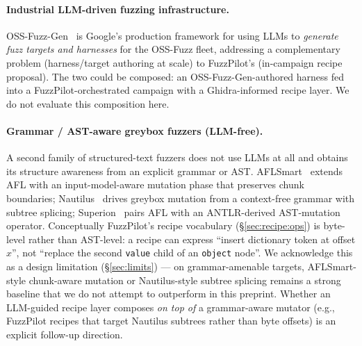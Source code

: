 \documentclass[11pt]{article}
\begin{document}
\paragraph{Industrial LLM-driven fuzzing infrastructure.}
OSS-Fuzz-Gen~\cite{liu2024ossfuzzgen} is Google's production
framework for using LLMs to \emph{generate fuzz targets and
harnesses} for the OSS-Fuzz fleet, addressing a complementary
problem (harness/target authoring at scale) to FuzzPilot's
(in-campaign recipe proposal). The two could be composed: an
OSS-Fuzz-Gen-authored harness fed into a FuzzPilot-orchestrated
campaign with a Ghidra-informed recipe layer. We do not evaluate
this composition here.

\paragraph{Grammar / AST-aware greybox fuzzers (LLM-free).}
A second family of structured-text fuzzers does not use LLMs at
all and obtains its structure awareness from an explicit
grammar or AST. AFLSmart~\cite{pham2019aflsmart} extends AFL with
an input-model-aware mutation phase that preserves chunk
boundaries; Nautilus~\cite{aschermann2019nautilus} drives
greybox mutation from a context-free grammar with subtree
splicing; Superion~\cite{wang2019superion} pairs AFL with an
ANTLR-derived AST-mutation operator. Conceptually FuzzPilot's
recipe vocabulary (\S\ref{sec:recipe:ops}) is byte-level rather
than AST-level: a recipe can express ``insert dictionary token at
offset $x$'', not ``replace the second \texttt{value} child of an
\texttt{object} node''. We acknowledge this as a design
limitation (\S\ref{sec:limits}) --- on grammar-amenable targets,
AFLSmart-style chunk-aware mutation or Nautilus-style subtree
splicing remains a strong baseline that we do not
attempt to outperform in this preprint. Whether an LLM-guided
recipe layer composes \emph{on top of} a grammar-aware mutator
(e.g., FuzzPilot recipes that target Nautilus subtrees rather
than byte offsets) is an explicit follow-up direction.
\end{document}
